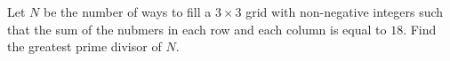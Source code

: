 Let $N$ be the number of ways to fill a $3\times 3$ grid with non-negative integers such that the sum of the nubmers in each row and each column is equal to $18$. Find the greatest prime divisor of $N$.
